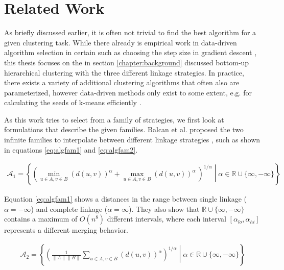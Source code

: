 \chapter{Related Work}

As briefly discussed earlier, it is often not trivial to find the best algorithm for a given clustering task. While there already is empirical work in data-driven algorithm selection in certain such as choosing the step size in gradient descent \cite{DBLP:journals/corr/GuptaR15b}, this thesis focuses on the in section \ref{chapter:background} discussed bottom-up hierarchical clustering with the three different linkage strategies. In practice, there exists a variety of additional clustering algorithms that often also are parameterized, however data-driven methods only exist to some extent, e.g. for calculating the seeds of k-means efficiently \cite{arthur2007k}.


As this work tries to select from a family of strategies, we first look at formulations that describe the given families. Balcan et al. proposed the two infinite families to interpolate between different linkage strategies \cite{DBLP:journals/corr/BalcanNVW16}, such as shown in equations \ref{eq:algfam1} and \ref{eq:algfam2}.

\begin{equation}
    \begin{aligned}
        \mathcal{A}_1 = \left\{ \left( \min\limits_{u \in A, v \in B} (d(u,v))^\alpha +  \max\limits_{u \in A, v \in B} (d(u,v))^\alpha\ \right)^{1 / \alpha} \middle| \alpha \in \mathbb{R} \cup \{\infty, -\infty\} \right\}
    \end{aligned}
    \label{eq:algfam1}
\end{equation}

Equation \ref{eq:algfam1} shows a distances in the range between single linkage ($\alpha = -\infty$) and complete linkage ($\alpha = \infty$). They also show that $\mathbb{R} \cup \{\infty, -\infty\}$ contains a maximum of $O(n^8)$ different intervals, where each interval $[\alpha_{lo}, \alpha_{hi}]$ represents a different merging behavior.

\begin{equation}
    \begin{aligned}
        \mathcal{A}_2 = \left\{ \left( \frac{1}{\|A\| \|B\|} \sum\limits_{u \in A, v \in B} (d(u,v))^\alpha \right)^{1 / \alpha} \middle| \alpha \in \mathbb{R} \cup \{\infty, -\infty\} \right\}
    \end{aligned}
    \label{eq:algfam2}
\end{equation}

